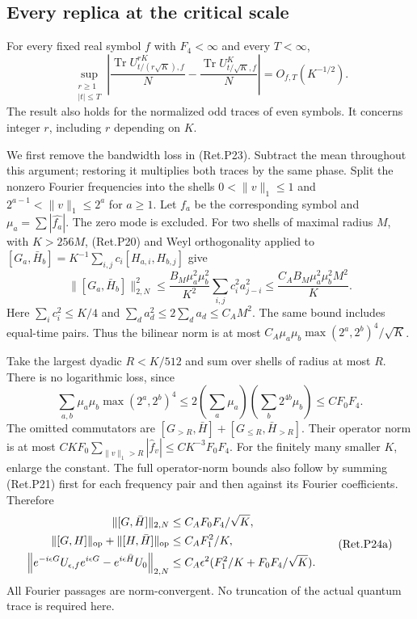 \hypertarget{every-replica-at-the-critical-scale}{%
\subsection{Every replica at the critical scale}\label{every-replica-at-the-critical-scale}}

\begin{theorem}\label{pass1:return_periodic-5} For every fixed real symbol
\(f\) with \(F_4<\infty\) and every \(T<\infty\),
\[
 \sup_{\substack{r\ge1\\|t|\le T}}
 \left|\frac{\operatorname{Tr}U_{t/(r\sqrt K),f}^{rK}}N
          -\frac{\operatorname{Tr}U_{t/\sqrt K,f}^{K}}N\right|
                  =O_{f,T}(K^{-1/2}).                      \tag{Ret.P24}
\]
The result also holds for the normalized odd traces of even symbols.
It concerns integer \(r\), including \(r\) depending on \(K\).
\end{theorem}

We first remove the bandwidth loss in (Ret.P23). Subtract the mean throughout
this argument; restoring it multiplies both traces by the same phase.
Split the nonzero Fourier frequencies into the shells
\(0<\|v\|_1\le1\) and \(2^{a-1}<\|v\|_1\le2^a\) for \(a\ge1\).
Let \(f_a\) be the corresponding symbol and
\(\mu_a=\sum|\widehat{f_a}|\). The zero mode is excluded.
For two shells of maximal radius \(M\), with \(K>256M\), (Ret.P20) and
Weyl orthogonality applied to
\([G_a,\bar H_b]=K^{-1}\sum_{i,j}c_i[H_{a,i},H_{b,j}]\) give
\[
 \|[G_a,\bar H_b]\|_{2,N}^2
 \le\frac{B_M\mu_a^2\mu_b^2}{K^2}
              \sum_{i,j}c_i^2a_{j-i}^2
 \le \frac{C_A B_M\mu_a^2\mu_b^2M^2}{K}.
\]
Here \(\sum_i c_i^2\le K/4\) and \(\sum_da_d^2\le2\sum_da_d\le C_AM^2\).
The same bound includes equal-time pairs. Thus the bilinear norm is at
most \(C_A\mu_a\mu_b\max(2^a,2^b)^4/\sqrt K\).

Take the largest dyadic \(R<K/512\) and sum over shells of radius at most
\(R\). There is no logarithmic loss, since
\[
 \sum_{a,b}\mu_a\mu_b\max(2^a,2^b)^4
 \le2\left(\sum_a\mu_a\right)
       \left(\sum_b2^{4b}\mu_b\right)\le C F_0F_4.
\]
The omitted commutators are
\([G_{>R},\bar H]+[G_{\le R},\bar H_{>R}]\).
Their operator norm is at most \(CKF_0\sum_{\|v\|_1>R}|\widehat f_v| \le CK^{-3}F_0F_4\). For the finitely many smaller \(K\), enlarge the constant.
The full operator-norm bounds also follow by summing (Ret.P21) first for
each frequency pair and then against its Fourier coefficients. Therefore
\[
 \begin{split}
 \|[G,\bar H]\|_{2,N}&\le C_A F_0F_4/\sqrt K,\\
 \|[G,H]\|_{\rm op}+\|[H,\bar H]\|_{\rm op}
                         &\le C_A F_1^2/K,\\
 \left\|e^{-i\epsilon G}U_{\epsilon,f}e^{i\epsilon G}
                         -e^{i\epsilon\bar H}U_0\right\|_{2,N}
 &\le C_A\epsilon^2
                   (F_1^2/K+F_0F_4/\sqrt K).
 \end{split}                                               \tag{Ret.P24a}
\]
All Fourier passages are norm-convergent. No truncation of the actual
quantum trace is required here.

